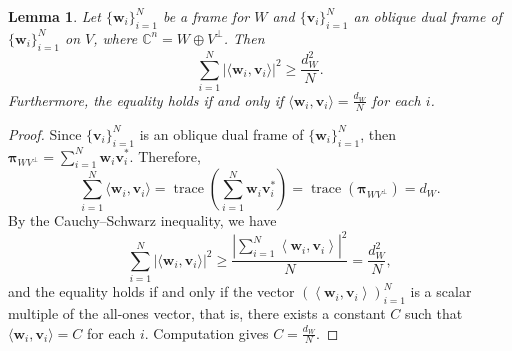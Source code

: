 \documentclass{amsart}
\numberwithin{equation}{section}
\DeclareMathOperator{\trace}{trace}
\newcommand{\bpi}{{\boldsymbol{\pi}}}
\newcommand{\bw}{{\mathbf w}}
\newcommand{\bv}{{\mathbf v}}
\newcommand{\ip}[2]{\left\langle#1,#2\right\rangle}
\newcommand{\abs}[1]{\left\vert#1\right\vert}
\theoremstyle{plain}
\newtheorem{lemma}[theorem]{Lemma}
\theoremstyle{remark}
\theoremstyle{definition}
\begin{document}
\begin{lemma}\label{lem:diaggram}
     Let $\{\mathbf{w}_i\}_{i=1}^N$ be a frame for $W$ and $\{\mathbf{v}_i\}_{i=1}^N$ an oblique dual frame of $\{\mathbf{w}_i\}_{i=1}^N$ on $V$, where $\mathbb{C}^n = W \oplus V^\perp$. Then
    \begin{equation*}
        \sum_{i=1}^N|\langle \mathbf{w}_i, \mathbf{v}_i \rangle |^2 \geq \frac{d_W^2}{N}.
    \end{equation*}
Furthermore, the equality holds if and only if $\langle \mathbf{w}_i, \mathbf{v}_i \rangle =\frac{d_W}{N}$ for each $i$. 
\end{lemma}
\begin{proof}
 Since $\{\mathbf{v}_i\}_{i=1}^N$ is an oblique dual frame of $\{\mathbf{w}_i\}_{i=1}^N$, then $\bpi_{WV^\perp} = \sum_{i=1}^N \mathbf{w}_i \mathbf{v}_i^*$.
    Therefore, 
     \begin{equation*}
       \sum_{i=1}^N \langle \mathbf{w}_i, \mathbf{v}_i \rangle =  \trace\left(\sum_{i=1}^N \mathbf{w}_i \mathbf{v}_i^*\right) = \trace(\bpi_{WV^\perp}) =d_W.
    \end{equation*}
 By the Cauchy–Schwarz inequality, we have
    \begin{equation*}
       \sum_{i=1}^N|\langle \mathbf{w}_i, \mathbf{v}_i \rangle |^2  \geq \frac{\abs{\sum_{i=1}^N \ip{\bw_i}{\bv_i}}^2}{N} = \frac{d_W^2}{N},
    \end{equation*}
    and the equality holds if and only if the vector $\left(\ip{\bw_i}{\bv_i}\right) _{i=1}^N$ is a scalar multiple of the all-ones vector, that is, there exists a constant $C$ such that $\langle \mathbf{w}_i, \mathbf{v}_i \rangle =C$ for each $i$. Computation gives $C =\frac{d_W}{N}$.
\end{proof}
\end{document}
